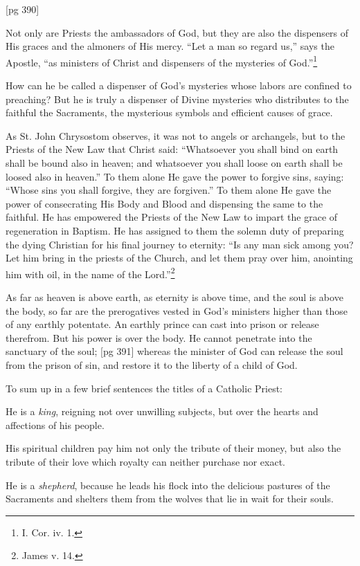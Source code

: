 [pg 390]

Not only are Priests the ambassadors of God,
but they are also the dispensers of His graces and
the almoners of His mercy. “Let a man so regard
us,” says the Apostle, “as ministers of
Christ and dispensers of the mysteries of God.”\footnote{I.
Cor. iv. 1.}

How can he be called a dispenser of God's mysteries
whose labors are confined to preaching?
But he is truly a dispenser of Divine mysteries
who distributes to the faithful the Sacraments, the
mysterious symbols and efficient causes of grace.

As St. John Chrysostom observes, it was not to
angels or archangels, but to the Priests of the New
Law that Christ said: “Whatsoever you shall bind
on earth shall be bound also in heaven; and whatsoever
you shall loose on earth shall be loosed also
in heaven.” To them alone He gave the power to
forgive sins, saying: “Whose sins you shall forgive,
they are forgiven.” To them alone He gave
the power of consecrating His Body and Blood and
dispensing the same to the faithful. He has empowered
the Priests of the New Law to impart the
grace of regeneration in Baptism. He has assigned
to them the solemn duty of preparing the
dying Christian for his final journey to eternity:
“Is any man sick among you? Let him bring in
the priests of the Church, and let them pray over
him, anointing him with oil, in the name of the
Lord.”\footnote{James v. 14.}

As far as heaven is above earth, as eternity is
above time, and the soul is above the body, so far
are the prerogatives vested in God's ministers
higher than those of any earthly potentate. An
earthly prince can cast into prison or release
therefrom. But his power is over the body. He
cannot penetrate into the sanctuary of the soul;
[pg 391]
whereas the minister of God can release the soul
from the prison of sin, and restore it to the liberty
of a child of God.

To sum up in a few brief sentences the titles of
a Catholic Priest:

He is a \emph{king}, reigning not over unwilling subjects,
but over the hearts and affections of his
people.

His spiritual children pay him not only the tribute
of their money, but also the tribute of their
love which royalty can neither purchase nor exact.

He is a \emph{shepherd}, because he leads his flock into
the delicious pastures of the Sacraments and shelters
them from the wolves that lie in wait for their
souls.

